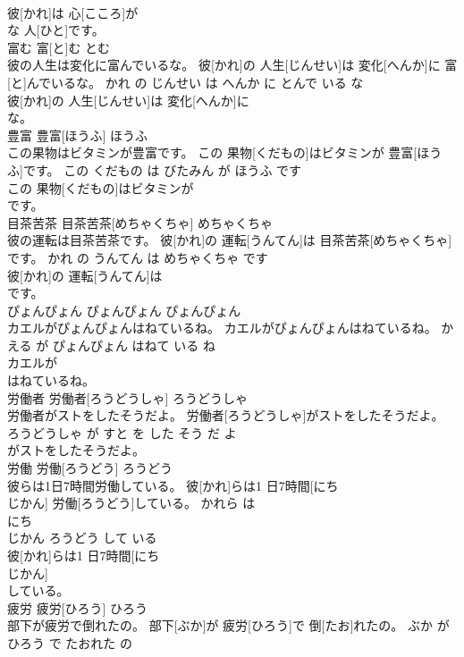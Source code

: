 \documentclass[8pt]{extreport}
\begin{document}
\begin{CJK}{UTF8}{min}
\\	彼[かれ]は 心[こころ]が
\\	な 人[ひと]です。			
\\	富む	富[と]む	とむ	
\\	彼の人生は変化に富んでいるな。	彼[かれ]の 人生[じんせい]は 変化[へんか]に 富[と]んでいるな。	かれ の じんせい は へんか に とんで いる な	
\\	彼[かれ]の 人生[じんせい]は 変化[へんか]に
\\	な。			
\\	豊富	豊富[ほうふ]	ほうふ	
\\	この果物はビタミンが豊富です。	この 果物[くだもの]はビタミンが 豊富[ほうふ]です。	この くだもの は びたみん が ほうふ です	
\\	この 果物[くだもの]はビタミンが
\\	です。			
\\	目茶苦茶	目茶苦茶[めちゃくちゃ]	めちゃくちゃ	
\\	彼の運転は目茶苦茶です。	彼[かれ]の 運転[うんてん]は 目茶苦茶[めちゃくちゃ]です。	かれ の うんてん は めちゃくちゃ です	
\\	彼[かれ]の 運転[うんてん]は
\\	です。			
\\	ぴょんぴょん	ぴょんぴょん	ぴょんぴょん	
\\	カエルがぴょんぴょんはねているね。	カエルがぴょんぴょんはねているね。	かえる が ぴょんぴょん はねて いる ね	
\\	カエルが
\\	はねているね。			
\\	労働者	労働者[ろうどうしゃ]	ろうどうしゃ	
\\	労働者がストをしたそうだよ。	労働者[ろうどうしゃ]がストをしたそうだよ。	ろうどうしゃ が すと を した そう だ よ	
\\	がストをしたそうだよ。			
\\	労働	労働[ろうどう]	ろうどう	
\\	彼らは1日7時間労働している。	彼[かれ]らは1 日7時間[にち 
\\	じかん] 労働[ろうどう]している。	かれら は 
\\	にち 
\\	じかん ろうどう して いる	
\\	彼[かれ]らは1 日7時間[にち 
\\	じかん]
\\	している。			
\\	疲労	疲労[ひろう]	ひろう	
\\	部下が疲労で倒れたの。	部下[ぶか]が 疲労[ひろう]で 倒[たお]れたの。	ぶか が ひろう で たおれた の	

\end{CJK}
\end{document}
